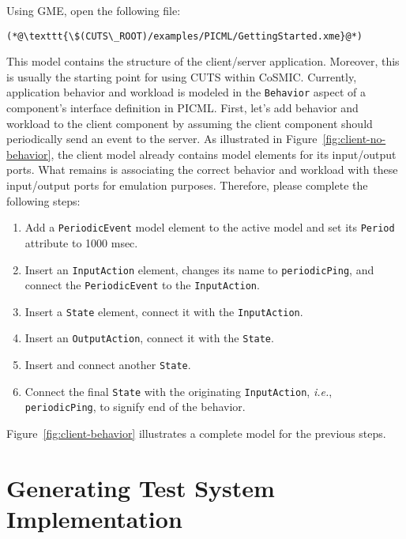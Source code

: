 Using GME, open the following file: 
\begin{lstlisting}
(*@\texttt{\$(CUTS\_ROOT)/examples/PICML/GettingStarted.xme}@*)
\end{lstlisting}
This model contains the structure of the client/\-server application. Moreover, 
this is usually the starting point for using CUTS within CoSMIC. 
Currently, application behavior and workload is modeled in the \texttt{Behavior}
aspect of a component's interface definition in PICML. First, let's add behavior 
and workload to the client component by assuming the client component should 
periodically send an event to the server.
As illustrated in Figure~\ref{fig:client-no-behavior}, the client model already
contains model elements for its input/\-output ports. What remains is associating
the correct behavior and workload with these input/\-output ports for emulation
purposes. Therefore, please complete the following steps:
\begin{enumerate}
  \item Add a \texttt{PeriodicEvent} model element to the active model and 
  set its \texttt{Period} attribute to 1000 msec. 
  
  \item Insert an \texttt{InputAction} element, changes its name to 
  \texttt{periodicPing}, and connect the \texttt{PeriodicEvent} to the \texttt{InputAction}.

  \item Insert a \texttt{State} element, connect it with the \texttt{InputAction}.

  \item Insert an \texttt{OutputAction}, connect it with the \texttt{State}.

  \item Insert and connect another \texttt{State}. 

  \item Connect the final \texttt{State} with the originating \texttt{InputAction},
  \textit{i.e.}, \texttt{periodicPing}, to signify end of the behavior.
\end{enumerate}
Figure~\ref{fig:client-behavior} illustrates a complete model for the previous 
steps.

\section{Generating Test System Implementation}
\label{sec:quickstart-generation}

